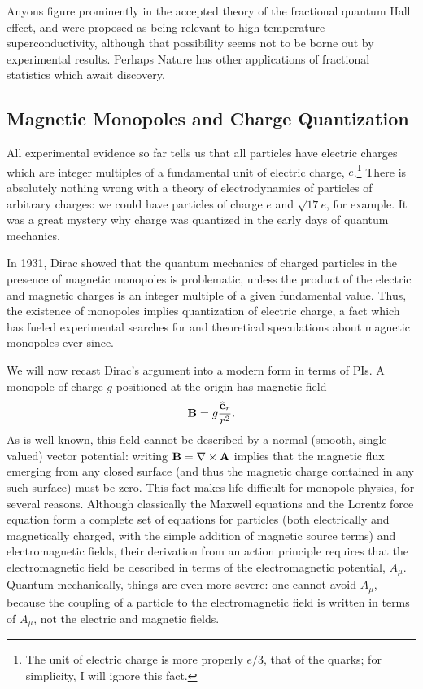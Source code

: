 \documentclass[12pt]{article}
\begin{document}
Anyons figure prominently in the accepted theory of the fractional
quantum Hall effect, and were proposed as being relevant to
high-temperature superconductivity, although that possibility seems not
to be borne out by experimental results. Perhaps Nature has other
applications of fractional statistics which await discovery.

\subsection{Magnetic Monopoles and Charge Quantization}

All experimental evidence so far tells us
that all particles have electric charges which
are integer multiples of a fundamental unit of electric charge,
$e$.\footnote{The unit of electric charge is more properly $e/3$,
that of the quarks; for simplicity, I will ignore this fact.}
There is absolutely nothing wrong with a theory of electrodynamics of
particles of arbitrary charges: we could have particles of charge $e$
and $\sqrt{17}e$, for example. It was a great mystery why charge was
quantized in the early days of quantum mechanics.

In 1931, Dirac showed that the quantum mechanics of charged particles
in the presence of magnetic monopoles is problematic, unless the
product of the electric and magnetic charges is an integer multiple of
a given fundamental value. Thus, the existence of monopoles implies
quantization of electric charge, a fact which has fueled experimental
searches for and theoretical speculations about magnetic monopoles
ever since.

We will now recast Dirac's argument into a modern form in terms of PIs.
A monopole of charge $g$ positioned at the origin has magnetic field
\[  {\mathbf B}=g{{\hat{{\mathbf e}}}_r\over r^2}.
\]
As is well known,
this field cannot be described by a normal (smooth, single-valued)
vector potential: writing ${\mathbf B}=\nabla\times{\mathbf A}$ implies that the
magnetic flux emerging from any closed surface (and thus the
magnetic charge contained in any such surface) must be zero. This fact
makes life difficult for monopole physics, for several
reasons. Although classically the Maxwell equations and the Lorentz
force equation form a complete set of equations for particles (both
electrically and magnetically charged, with the simple addition of
magnetic source terms) and
electromagnetic fields, their derivation from an action principle
requires that the electromagnetic field be described in terms of the
electromagnetic potential, $A_\mu$. Quantum mechanically, things are
even more severe: one cannot avoid $A_\mu$,
because the coupling of a particle to the electromagnetic
field is written in terms of $A_\mu$, not the electric and magnetic
fields.
\end{document}
